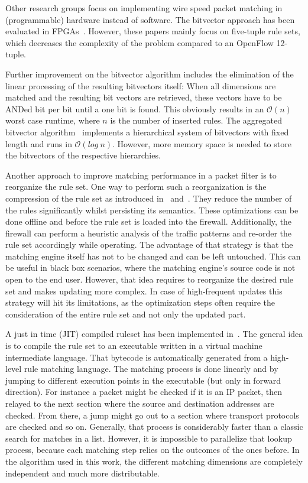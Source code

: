 \documentclass[a4paper,
		12pt,
		parskip=full,
		titlepage
		]{scrartcl}
\begin{document}
Other research groups focus on implementing wire speed packet matching in (programmable) hardware instead of software.
The bitvector approach has been evaluated in FPGAs~\cite{bitvector_fpga, qu2013fast}.
However, these papers mainly focus on five-tuple rule sets, which decreases 
the complexity of the problem compared to an OpenFlow 12-tuple.

Further improvement on the bitvector algorithm includes the elimination of the linear processing of the resulting bitvectors itself:
When all dimensions are matched and the resulting bit vectors are retrieved, 
these vectors have to be ANDed bit per bit until a one bit is found.
This obviously results in an $\mathcal O(n)$ worst case runtime, where $n$ is the number of inserted rules.
The aggregated bitvector algorithm~\cite{abv} implements a hierarchical system 
of bitvectors with fixed length and runs in $\mathcal O(log\ n)$.
However, more memory space is needed to store the bitvectors of the respective hierarchies.

Another approach to improve matching performance in a packet filter is to reorganize the rule set.
One way to perform such a reorganization is the compression of the rule set as 
introduced in~\cite{firewall_compressor} and~\cite{redundancy_removal}.
They reduce the number of the rules significantly whilst persisting its semantics.
These optimizations can be done offline and before the rule set is loaded into the firewall.
Additionally, the firewall can perform a heuristic analysis of the traffic patterns and re-order the rule set accordingly while operating.
The advantage of that strategy is that the matching engine itself has not to be changed and can be left untouched.
This can be useful in black box scenarios, where the matching engine's source code is not open to the end user.
However, that idea requires to reorganize the desired rule set and makes updating more complex.
In case of high-frequent updates this strategy will hit its limitations, 
as the optimization steps often require the consideration of the entire rule set and not only the updated part.

A just in time (JIT) compiled ruleset has been implemented in~\cite{bpfplus}.
The general idea is to compile the rule set to an executable written in a virtual machine intermediate language.
That bytecode is automatically generated from a high-level rule matching language.
The matching process is done linearly and by jumping to different execution points in the executable (but only in forward direction).
For instance a packet might be checked if it is an IP packet, then relayed 
to the next section where the source and destination addresses are checked.
From there, a jump might go out to a section where transport protocols are checked and so on.
Generally, that process is considerably faster than a classic search for matches in a list.
However, it is impossible to parallelize that lookup process, because each matching step relies on the outcomes of the ones before.
In the algorithm used in this work, the different matching dimensions are 
completely independent and much more distributable.
\end{document}
